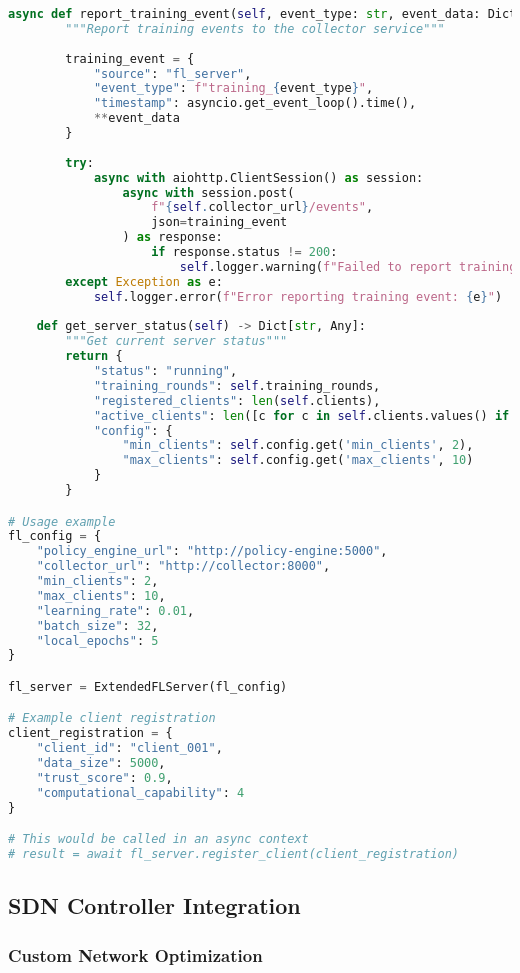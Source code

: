\begin{lstlisting}[language=python, caption=Extended FL Server Implementation]
    async def report_training_event(self, event_type: str, event_data: Dict[str, Any]):
        """Report training events to the collector service"""
        
        training_event = {
            "source": "fl_server",
            "event_type": f"training_{event_type}",
            "timestamp": asyncio.get_event_loop().time(),
            **event_data
        }
        
        try:
            async with aiohttp.ClientSession() as session:
                async with session.post(
                    f"{self.collector_url}/events",
                    json=training_event
                ) as response:
                    if response.status != 200:
                        self.logger.warning(f"Failed to report training event: {response.status}")
        except Exception as e:
            self.logger.error(f"Error reporting training event: {e}")
    
    def get_server_status(self) -> Dict[str, Any]:
        """Get current server status"""
        return {
            "status": "running",
            "training_rounds": self.training_rounds,
            "registered_clients": len(self.clients),
            "active_clients": len([c for c in self.clients.values() if c['status'] == 'registered']),
            "config": {
                "min_clients": self.config.get('min_clients', 2),
                "max_clients": self.config.get('max_clients', 10)
            }
        }

# Usage example
fl_config = {
    "policy_engine_url": "http://policy-engine:5000",
    "collector_url": "http://collector:8000",
    "min_clients": 2,
    "max_clients": 10,
    "learning_rate": 0.01,
    "batch_size": 32,
    "local_epochs": 5
}

fl_server = ExtendedFLServer(fl_config)

# Example client registration
client_registration = {
    "client_id": "client_001",
    "data_size": 5000,
    "trust_score": 0.9,
    "computational_capability": 4
}

# This would be called in an async context
# result = await fl_server.register_client(client_registration)
\end{lstlisting}

\subsection{SDN Controller Integration}

\subsubsection{Custom Network Optimization}

